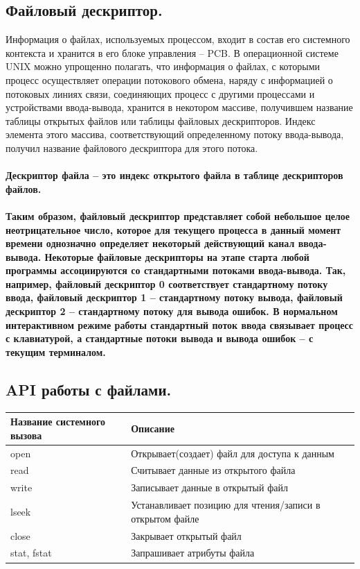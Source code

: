 \documentclass[a4paper]{article}
\begin{document}
\subsection{\Large Файловый дескриптор.}
Информация о файлах, используемых процессом, входит в состав его системного контекста и хранится в его блоке управления – PCB. В операционной системе UNIX можно упрощенно полагать, что информация о файлах, с которыми процесс осуществляет операции потокового обмена, наряду с информацией о потоковых линиях связи, соединяющих процесс с другими процессами и устройствами ввода-вывода, хранится в некотором массиве, получившем название таблицы открытых файлов или таблицы файловых дескрипторов. Индекс элемента
этого массива, соответствующий определенному потоку ввода-вывода, получил название файлового дескриптора для этого потока.\\\\
\bf Дескриптор файла \rm – это индекс открытого файла в таблице дескрипторов файлов.\\\\
Таким образом, файловый дескриптор представляет собой небольшое целое неотрицательное число, которое для текущего процесса в данный момент времени однозначно определяет некоторый действующий канал ввода-вывода. Некоторые файловые дескрипторы на этапе старта любой программы ассоциируются со стандартными потоками ввода-вывода. Так, например, файловый дескриптор 0 соответствует стандартному потоку ввода, файловый дескриптор 1 – стандартному потоку вывода, файловый дескриптор 2 – стандартному потоку для вывода ошибок. В нормальном интерактивном режиме работы стандартный поток ввода связывает процесс с клавиатурой, а стандартные потоки вывода и вывода ошибок – с текущим терминалом.

\subsection{\Large API работы с файлами.}
\begin{center}
  \begin{tabular}{|p{3cm}|p{12cm}|}
  \hline 
  Название системного вызова & Описание \\
  \hline 
  open & Открывает(создает) файл для доступа к данным\\
  \hline 
  read & Считывает данные из открытого файла\\
  \hline 
  write & Записывает данные в открытый файл\\
  \hline 
  lseek & Устанавливает позицию для чтения/записи в открытом файле\\
  \hline 
  close & Закрывает открытый файл\\
  \hline 
  stat, fstat & Запрашивает атрибуты файла\\
  \hline 
  \end{tabular}
\end{center}
\end{document}
